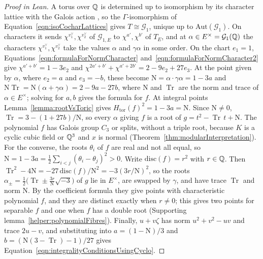 \begin{proof}[Proof in Lean]

\leanok


A torus over $\mathbb{Q}$ is determined up to isomorphism by its character lattice with the Galois action \cite[Theorem~12.23]{milne}, so the $\Gamma$-isomorphism of Equation~\ref{eqn:isoCocharLattices} gives $T\cong\mathcal G_1$, unique up to $\mathrm{Aut}(\mathcal G_1)$. On characters it sends $\chi^{v_1^\vee},\chi^{v_2^\vee}$ of $\mathcal G_{1,E}$ to $\chi^{a'},\chi^{b'}$ of $T_E$, and at $\alpha\in E^\times=\mathcal G_1(\mathbb{Q})$ the characters $\chi^{v_1^\vee},\chi^{v_2^\vee}$ take the values $\alpha$ and $\gamma\alpha$ in some order. On the chart $e_1=1$, Equations~\ref{eqn:formulaForNormCharacter} and~\ref{eqn:formulaForNormCharacter2} give $\chi^{a'+b'}=1-3e_2$ and $\chi^{2a'+b'}+\chi^{a'+2b'}=2-9e_2+27e_3$. At the point given by $\alpha$, where $e_2=a$ and $e_3=-b$, these become $\mathrm N=\alpha\cdot\gamma\alpha=1-3a$ and $\mathrm N\operatorname{Tr}=\mathrm N(\alpha+\gamma\alpha)=2-9a-27b$, where $\mathrm N$ and $\operatorname{Tr}$ are the norm and trace of $\alpha\in E^\times$; solving for $a,b$ gives the formula for $f$. At integral points Lemma~\ref{lemma:rootVsToric} gives $H_{\mathrm{tor}}(f)^2=1-3a=\mathrm N$. Since $\mathrm N\neq0$, $\operatorname{Tr}=3-(1+27b)/\mathrm N$, so every $\alpha$ giving $f$ is a root of $g=t^2-\operatorname{Tr}\,t+\mathrm N$. The polynomial $f$ has Galois group $C_3$ or splits, without a triple root, because $K$ is a cyclic cubic field or $\mathbb{Q}^3$ and $x$ is normal (Theorem~\ref{thm:modularInterpretation}). For the converse, the roots $\theta_i$ of $f$ are real and not all equal, so $\mathrm N=1-3a=\tfrac12\sum_{i<j}(\theta_i-\theta_j)^2>0$. Write $\mathrm{disc}(f)=r^2$ with $r\in\mathbb{Q}$. Then $\operatorname{Tr}^2-4\mathrm N=-27\,\mathrm{disc}(f)/\mathrm N^2=-3(3r/\mathrm N)^2$, so the roots $\alpha_\pm=\tfrac12\bigl(\operatorname{Tr}\pm\tfrac{3r}{\mathrm N}\sqrt{-3}\bigr)$ of $g$ lie in $E^\times$, are swapped by $\gamma$, and have trace $\operatorname{Tr}$ and norm $\mathrm N$. By the coefficient formula they give points with characteristic polynomial $f$, and they are distinct exactly when $r\neq0$; this gives two points for separable $f$ and one when $f$ has a double root (Supporting lemma~\ref{helper:polynomialFibres}). Finally, $u+v\zeta$ has norm $u^2+v^2-uv$ and trace $2u-v$, and substituting into $a=(1-\mathrm N)/3$ and $b=(\mathrm N(3-\operatorname{Tr})-1)/27$ gives Equation~\ref{eqn:integralityConditionsUsingCyclo}.

\end{proof}

